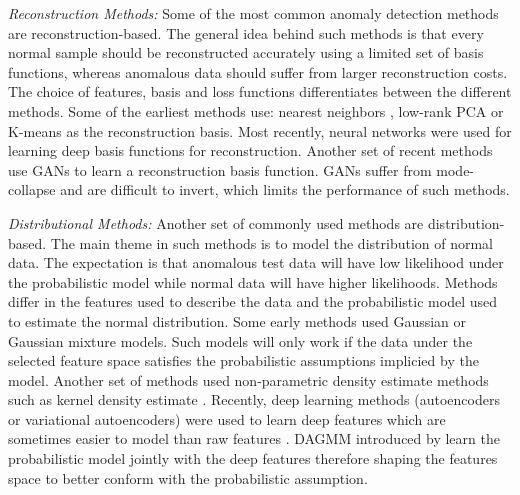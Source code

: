 \documentclass{article} \usepackage{iclr2020_conference,times}
\begin{document}
\textit{Reconstruction Methods:} Some of the most common anomaly detection methods are reconstruction-based. The general idea behind such methods is that every normal sample should be reconstructed accurately using a limited set of basis functions, whereas anomalous data should suffer from larger reconstruction costs. The choice of features, basis and loss functions differentiates between the different methods. Some of the earliest methods use: nearest neighbors \citep{eskin2002geometric}, low-rank PCA \citep{jolliffe2011principal, candes2011robust} or K-means \citep{hartigan1979algorithm} as the reconstruction basis. Most recently, neural networks were used \citep{sakurada2014anomaly, xia2015learning} for learning deep basis functions for reconstruction. Another set of recent methods \citep{schlegl2017unsupervised,deecke2018anomaly} use GANs to learn a reconstruction basis function. GANs suffer from mode-collapse and are difficult to invert, which limits the performance of such methods. 

\textit{Distributional Methods:} Another set of commonly used methods are distribution-based. The main theme in such methods is to model the distribution of normal data. The expectation is that anomalous test data will have low likelihood under the probabilistic model while normal data will have higher likelihoods. Methods differ in the features used to describe the data and the probabilistic model used to estimate the normal distribution. Some early methods used Gaussian or Gaussian mixture models. Such models will only work if the data under the selected feature space satisfies the probabilistic assumptions implicied by the model. Another set of methods used non-parametric density estimate methods such as kernel density estimate \citep{parzen1962estimation}. Recently, deep learning methods (autoencoders or variational autoencoders) were used to learn deep features which are sometimes easier to model than raw features \citep{yang2017towards}. DAGMM introduced by \cite{zong2018deep} learn the probabilistic model jointly with the deep features therefore shaping the features space to better conform with the probabilistic assumption.
\end{document}
